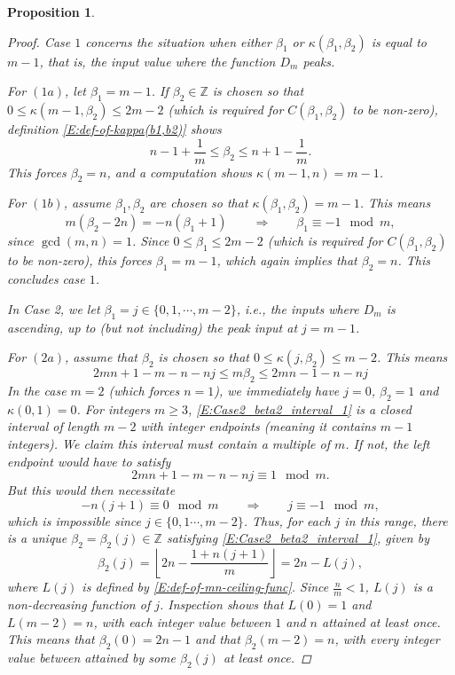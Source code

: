 \documentclass[10pt,a4paper]{amsart}
\newtheorem{proposition}{Proposition}
\newcommand{\Z}{{\mathbb Z}}
\begin{document}
\begin{proposition}
\begin{proof}
Case $1$ concerns the situation when either $\beta_1$ or $\kappa(\beta_1,\beta_2)$ is equal to $m-1$, that is, the input value where the function $D_m$ peaks.

For $(1a)$, let $\beta_1 = m-1$. 
If $\beta_2 \in \Z$ is chosen so that $0 \le \kappa(m-1,\beta_2) \le 2m-2$ (which is required for $C(\beta_1,\beta_2)$ to be non-zero), definition \eqref{E:def-of-kappa(b1,b2)} shows
\begin{equation*}
n-1+\frac{1}{m} \le \beta_2 \le n + 1 -\frac{1}{m}.
\end{equation*}
This forces $\beta_2 = n$, and a computation shows $\kappa(m-1,n) = m-1$.

For $(1b)$, assume $\beta_1,\beta_2$ are chosen so that $\kappa(\beta_1,\beta_2) = m-1$.
This means
\begin{equation*}
m(\beta_2-2n) = -n(\beta_1+1) \qquad \Longrightarrow \qquad \beta_1 \equiv -1 \mod m,
\end{equation*}
since $\gcd(m,n)=1$.
Since $0\le \beta_1 \le 2m-2$ (which is required for $C(\beta_1,\beta_2)$ to be non-zero), this forces $\beta_1 = m-1$, which again implies that $\beta_2 = n$.
This concludes case $1$.

In Case 2, we let $\beta_1 = j \in \{0,1,\cdots,m-2 \}$, i.e., the inputs where $D_m$ is ascending, up to (but not including) the peak input at $j=m-1$.

For $(2a)$, assume that $\beta_2$ is chosen so that $0 \le \kappa(j,\beta_2) \le m-2$.
This means 
\begin{equation}\label{E:Case2_beta2_interval_1}
2mn +1 -m -n -nj \le m \beta_2 \le 2mn -1 -n -nj
\end{equation}
In the case $m=2$ (which forces $n=1$), we immediately have $j=0$, $\beta_2 = 1$ and $\kappa(0,1) = 0$.
For integers $m \ge 3$, \eqref{E:Case2_beta2_interval_1} is a closed interval of length $m-2$ with integer endpoints (meaning it contains $m-1$ integers).
We claim this interval must contain a multiple of $m$.
If not, the left endpoint would have to satisfy
\begin{equation*}
2mn +1 -m -n -nj \equiv 1 \mod m.
\end{equation*}
But this would then necessitate
\begin{equation*}
-n(j+1) \equiv 0 \mod m \qquad \Longrightarrow \qquad j \equiv -1 \mod m,
\end{equation*}
which is impossible since $j \in \{0,1 \cdots, m-2\}$.
Thus, for each $j$ in this range, there is a unique $\beta_2 = \beta_2(j) \in \Z$ satisfying \eqref{E:Case2_beta2_interval_1}, given by
\begin{equation}\label{E:beta2-def-inside-proof}
\beta_2(j) = \left\lfloor 2n - \frac{1+n(j+1)}{m}  \right\rfloor = 2n - L(j),
\end{equation}
where $L(j)$ is defined by \eqref{E:def-of-mn-ceiling-func}. 
Since $\frac{n}{m}<1$, $L(j)$ is a non-decreasing function of $j$.
Inspection shows that $L(0) = 1$ and $L(m-2) = n$, with each integer value between $1$ and $n$ attained at least once.
This means that $\beta_2(0) = 2n-1$ and that $\beta_2(m-2) = n$, with every integer value between attained by some $\beta_2(j)$ at least once.


\end{proof}
\end{proposition}
\end{document}
